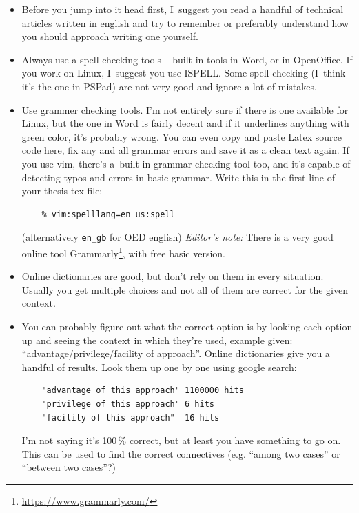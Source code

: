 \begin{itemize}
  \item{Before you jump into it head first, I~suggest you read a handful of technical articles written in english and try to remember or preferably understand how you should approach writing one yourself.}
  \item{Always use a spell checking tools -- built in tools in Word, or in OpenOffice. If you work on Linux, I~suggest you use ISPELL. Some spell checking (I~think it's the one in PSPad) are not very good and ignore a lot of mistakes.}
  \item{Use grammer checking tools. I'm not entirely sure if there is one available for Linux, but the one in Word is fairly decent and if it underlines anything with green color, it's probably wrong. You can even copy and paste Latex source code here, fix any and all grammar errors and save it as a clean text again. If you use vim, there's a~built in grammar checking tool too, and it's capable of detecting typos and errors in basic grammar. Write this in the first line of your thesis tex file:
  \begin{verbatim}
    % vim:spelllang=en_us:spell
  \end{verbatim}
  (alternatively \texttt{en\_gb} for OED english) \textit{Editor's note:} There is a very good online tool Grammarly\footnote{\url{https://www.grammarly.com/}}, with free basic version.
  }
  \item{Online dictionaries are good, but don't rely on them in every situation. Usually you get multiple choices and not all of them are correct for the given context.}
  \item{\begin{samepage}You can probably figure out what the correct option is by looking each option up and seeing the context in which they're used, example given: ``advantage/privilege/facility of approach''. Online dictionaries give you a handful of results. Look them up one by one using google search:
  \begin{verbatim}
    "advantage of this approach" 1100000 hits
    "privilege of this approach" 6 hits
    "facility of this approach"  16 hits
  \end{verbatim}
  I'm not saying it's 100\,\% correct, but at least you have something to go on. This can be used to find the correct connectives (e.g. ``among two cases'' or ``between two cases''?)\end{samepage}}
\end{itemize}
       
